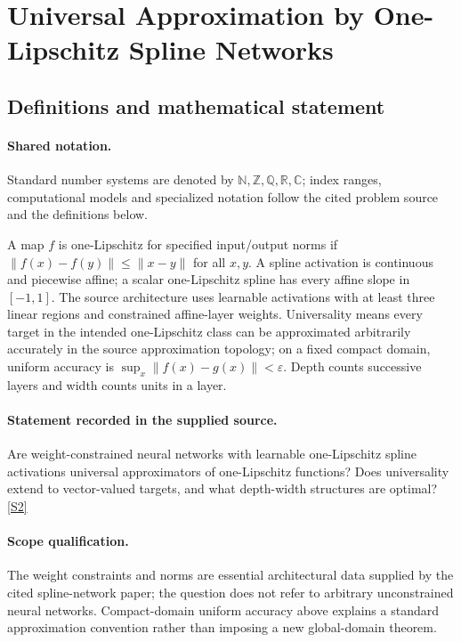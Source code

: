 \documentclass[11pt]{article}
\newcommand{\sref}[2]{\hyperlink{source:#1:#2}{[S#2]}}
\begin{document}
\section{Universal Approximation by One-Lipschitz Spline Networks}\label{statement}

\subsection{Definitions and mathematical statement}

\paragraph{Shared notation.}Standard number systems are denoted by $\mathbb N,\mathbb Z,\mathbb Q,\mathbb R,\mathbb C$; index ranges, computational models and specialized notation follow the cited problem source and the definitions below.


A map $f$ is one-Lipschitz for specified input/output norms if $\lVert f(x)-f(y)\rVert\leq\lVert x-y\rVert$ for all $x,y$. A spline activation is continuous and piecewise affine; a scalar one-Lipschitz spline has every affine slope in $[-1,1]$. The source architecture uses learnable activations with at least three linear regions and constrained affine-layer weights. Universality means every target in the intended one-Lipschitz class can be approximated arbitrarily accurately in the source approximation topology; on a fixed compact domain, uniform accuracy is $\sup_x\lVert f(x)-g(x)\rVert<\varepsilon$. Depth counts successive layers and width counts units in a layer.
\paragraph{Statement recorded in the supplied source.}
Are weight-constrained neural networks with learnable one-Lipschitz spline activations universal approximators of one-Lipschitz functions? Does universality extend to vector-valued targets, and what depth-width structures are optimal? \sref{statement}{2}
\paragraph{Scope qualification.}
The weight constraints and norms are essential architectural data supplied by the cited spline-network paper; the question does not refer to arbitrary unconstrained neural networks. Compact-domain uniform accuracy above explains a standard approximation convention rather than imposing a new global-domain theorem.
\end{document}
